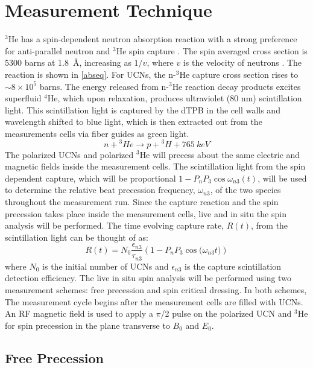 \section{Measurement Technique}

$^3$He has a spin-dependent neutron absorption reaction with a strong preference for anti-parallel neutron and $^3$He spin capture \cite{Passell1966}. The spin averaged cross section is 5300 barns at 1.8~\AA, increasing as $1/v$, where $v$ is the velocity of neutrons \cite{Mughabghab1981}. The reaction is shown in \cref{abseq}. For UCNs, the n-$^3$He capture cross section rises to $\sim 8\times 10^5$ barns. The energy released from n-$^3$He reaction decay products excites superfluid $^4$He, which upon relaxation, produces ultraviolet (80 nm) scintillation light. This scintillation light is captured by the dTPB in the cell walls and wavelength shifted to blue light, which is then extracted out from the measurements cells via fiber guides as green light. 
\begin{equation}
n + {^3He} \rightarrow p+{^3}H+765 \ keV
\label{abseq}
\end{equation}
The polarized UCNs and polarized $^3$He will precess about the same electric and magnetic fields inside the measurement cells. The scintillation light from the spin dependent capture, which will be proportional $1-P_nP_3\cos{\omega_{n3}(t)}$, will be used to determine the relative beat precession frequency, $\omega_{n3}$, of the two species throughout the measurement run. Since the capture reaction and the spin precession takes place inside the measurement cells, live and in situ the spin analysis will be performed. The time evolving capture rate, $R(t)$, from the scintillation light can be thought of as: 
\begin{equation}
    R(t) = N_0 \frac{\epsilon_{n3}}{\tau_{n3}} \left ( 1-P_n P_3 \cos{(\omega_{n3}t}) \right )
    \label{eq:cap_rate}
\end{equation}
where $N_0$ is the initial number of UCNs and $\epsilon_{n3}$ is the capture scintillation detection efficiency.
The live in situ spin analysis will be performed using two measurement schemes: free precession and spin critical dressing. In both schemes, The measurement cycle begins after the measurement cells are filled with UCNs. An RF magnetic field is used to apply a $\pi$/2 pulse on the polarized UCN and $^3$He for spin precession in the plane transverse to $B_0$ and $E_0$.


\subsection{Free Precession}

